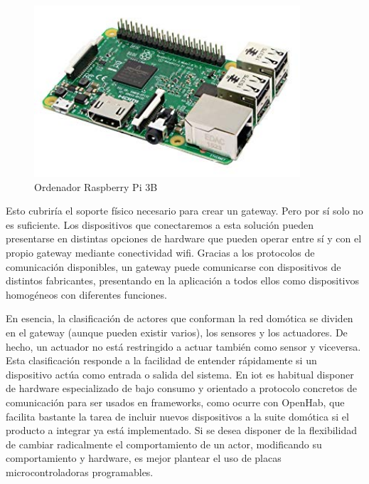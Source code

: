 \begin{figure}[hbt!]
\centering
\includegraphics[height=2.5in]{figures/raspberrypi3b.jpg}
\caption[captura de una Raspberry]{Ordenador Raspberry Pi 3B\footnotemark}
\end{figure}

\vspace{1.5cm}


Esto cubriría el soporte físico necesario para crear un gateway. Pero por sí solo no es suficiente. Los dispositivos que conectaremos a esta solución pueden presentarse en distintas opciones de hardware que pueden operar entre sí y con el propio gateway mediante conectividad \gls{wifi}. Gracias a los protocolos de comunicación disponibles, un gateway puede comunicarse con dispositivos de distintos fabricantes, presentando en la aplicación a todos ellos como dispositivos homogéneos con diferentes funciones.

\vspace{1.5cm}

En esencia, la clasificación de actores que conforman la red domótica se dividen en el gateway (aunque pueden existir varios), los sensores y los actuadores. De hecho, un actuador no está restringido a actuar también como sensor y viceversa. Esta clasificación responde a la facilidad de entender rápidamente si un dispositivo actúa como entrada o salida del sistema. En \gls{iot} es habitual disponer de hardware especializado de bajo consumo y orientado a protocolo concretos de comunicación para ser usados en frameworks, como ocurre con OpenHab, que facilita bastante la tarea de incluir nuevos dispositivos a la suite domótica si el producto a integrar ya está implementado. Si se desea disponer de la flexibilidad de cambiar radicalmente el comportamiento de un actor, modificando su comportamiento y hardware, es mejor plantear el uso de placas microcontroladoras programables.

\vspace{1.5cm}

